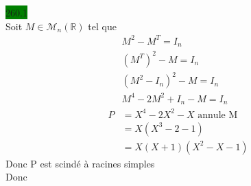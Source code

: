 \documentclass{article}
\begin{document}
 \noindent
\colorbox{green}{260.1}\\
Soit \(M \in \mathcal{M}_n(\mathbb{R})\) tel que \begin{align*}
    &M^2 - M^T = I_n \\
    &(M^T)^2 - M = I_n \\
    &(M^2 - I_n)^2 - M = I_n \\
    &M^4 - 2M^2 + I_n - M = I_n \\
    P &= X^4 - 2X^2 - X \text{ annule M}\\
    &= X(X^3-2-1)\\
    &= X(X+1)(X^2 - X -1)
\end{align*}
Donc P est scindé à racines simples \\
Donc \\
\end{document}
